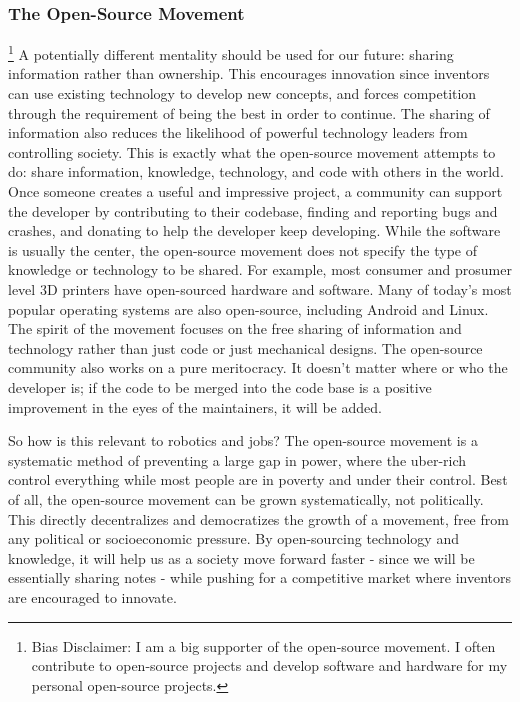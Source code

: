 \subsubsection{The Open-Source Movement} 
\footnote{Bias Disclaimer: I am a big supporter of the open-source movement. I often contribute to open-source projects and develop software and hardware for my personal open-source projects.}
\label{subsec:open-source} 
A potentially different mentality should be used for our future: sharing information rather than ownership. This encourages innovation since inventors can use existing technology to develop new concepts, and forces competition through the requirement of being the best in order to continue. The sharing of information also reduces the likelihood of powerful technology leaders from controlling society. This is exactly what the open-source movement attempts to do: share information, knowledge, technology, and code with others in the world. Once someone creates a useful and impressive project, a community can support the developer by contributing to their codebase, finding and reporting bugs and crashes, and donating to help the developer keep developing. While the software is usually the center, the open-source movement does not specify the type of knowledge or technology to be shared. For example, most consumer and prosumer level 3D printers have open-sourced hardware and software. Many of today's most popular operating systems are also open-source, including Android and Linux. The spirit of the movement focuses on the free sharing of information and technology rather than just code or just mechanical designs. The open-source community also works on a pure meritocracy. It doesn't matter where or who the developer is; if the code to be merged into the code base is a positive improvement in the eyes of the maintainers, it will be added.

So how is this relevant to robotics and jobs? The open-source movement is a systematic method of preventing a large gap in power, where the uber-rich control everything while most people are in poverty and under their control. Best of all, the open-source movement can be grown systematically, not politically. This directly decentralizes and democratizes the growth of a movement, free from any political or socioeconomic pressure. By open-sourcing technology and knowledge, it will help us as a society move forward faster - since we will be essentially sharing notes - while pushing for a competitive market where inventors are encouraged to innovate. 

